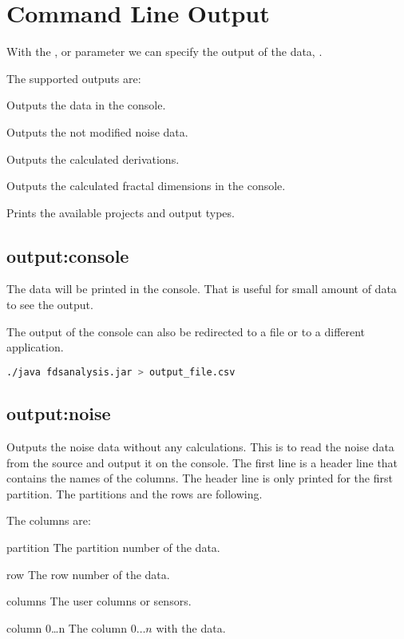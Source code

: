 \section{Command Line Output}

With the ,  or 
parameter we can specify the output of the data, \marker{}.

The supported outputs are:
\begin{asparadesc}
\item[\code{output:console}]
Outputs the data in the console.
\item[\code{output:noise}]
Outputs the not modified noise data.
\item[\code{output:derivated}]
Outputs the calculated derivations.
\item[\code{output:fractal}]
Outputs the calculated fractal dimensions in the console.
\item[\code{output:projects}]
Prints the available projects and output types.
\end{asparadesc}

\subsection{output:console}

The data will be printed in the console. That is useful for small amount of data
to see the output.

The output of the console can also be redirected to a file or to a different
application.

\begin{lstlisting}[style=nonumbers,language=bash, caption={Example redirect to file}]
./java fdsanalysis.jar > output_file.csv
\end{lstlisting}

\subsection{output:noise}

Outputs the noise data without any calculations. This is to read the noise data
from the source and output it on the console.
The first line is a header line that contains the names of the columns.
The header line is only printed for the first partition.
The partitions and the rows are following.

The columns are:
\begin{asparadesc}
\item[partition]
The partition number of the data.
\item[row]
The row number of the data.
\item[columns]
The user columns or sensors.
\item[column 0\dots{n}]
The column $0\dots{n}$ with the data.
\end{asparadesc}

